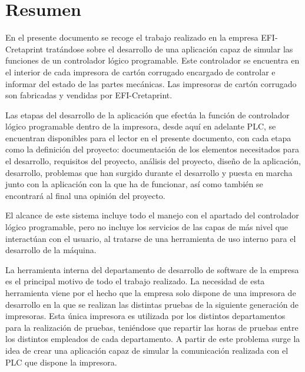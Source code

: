 \documentclass[pdftex,11pt,a4paper]{book}
\begin{document}

\thispagestyle{empty} %

\clearpage %

\section*{Resumen}

En el presente documento se recoge el trabajo realizado en la empresa EFI-Cretaprint tratándose sobre el desarrollo de una aplicación capaz de simular las funciones de un controlador lógico programable. Este controlador se encuentra en el interior de cada impresora de cartón corrugado encargado de controlar e informar del estado de las partes mecánicas. Las impresoras de cartón corrugado son fabricadas y vendidas por EFI-Cretaprint.

Las etapas del desarrollo de la aplicación que efectúa la función de controlador lógico programable dentro de la impresora, desde aquí en adelante PLC, se encuentran disponibles para el lector en el presente documento, con cada etapa como la definición del proyecto: documentación de los elementos necesitados para el desarrollo, requisitos del proyecto, análisis del proyecto, diseño de la aplicación, desarrollo, problemas que han surgido durante el desarrollo y puesta en marcha junto con la aplicación con la que ha de funcionar, así como también se encontrará al final una opinión del proyecto.

El alcance de este sistema incluye todo el manejo con el apartado del controlador lógico programable, pero no incluye los servicios de las capas de más nivel que interactúan con el usuario, al tratarse de una herramienta de uso interno para el desarrollo de la máquina.

La herramienta interna del departamento de desarrollo de software de la empresa es el principal motivo de todo el trabajo realizado. La necesidad de esta herramienta viene por el hecho que la empresa solo dispone de una impresora de desarrollo en la que se realizan las distintas pruebas de la siguiente generación de impresoras. Esta única impresora es utilizada por los distintos departamentos para la realización de pruebas, teniéndose que repartir las horas de pruebas entre los distintos empleados de cada departamento. A partir de este problema surge la idea de crear una aplicación capaz de simular la comunicación realizada con el PLC que dispone la impresora.
\end{document}
